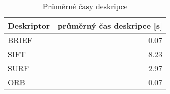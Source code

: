 \begin{table}[!ht]\centering
\begin{tabular}{ l| r }
	Deskriptor & průměrný čas deskripce [s] \\
	\hline
	 BRIEF & 0.07 \\
	 SIFT & 8.23 \\
	 SURF & 2.97 \\
	 ORB & 0.07
\end{tabular}
	\caption[Short Heading]{\protect Průměrné časy deskripce}\label{tab_desctimes}
\end{table}